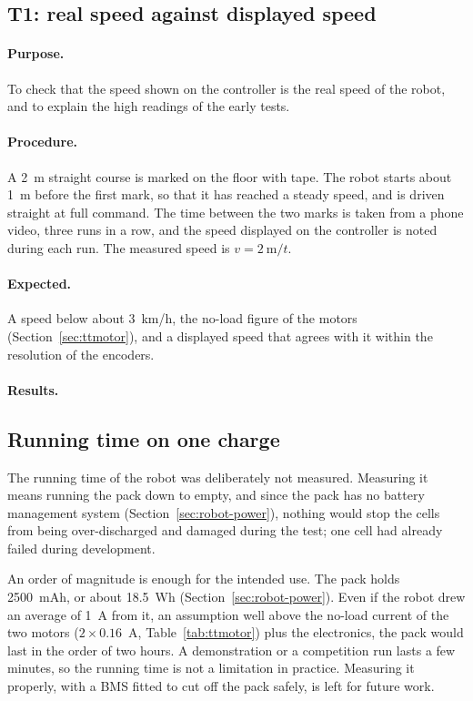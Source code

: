 \subsection{T1: real speed against displayed speed}
\paragraph{Purpose.} To check that the speed shown on the controller is the real speed of
the robot, and to explain the high readings of the early tests.
\paragraph{Procedure.} A 2~m straight course is marked on the floor with tape. The robot
starts about 1~m before the first mark, so that it has reached a steady speed, and is
driven straight at full command. The time between the two marks is taken from a phone
video, three runs in a row, and the speed displayed on the controller is noted during
each run. The measured speed is \(v = 2~\text{m} / t\).
\paragraph{Expected.} A speed below about 3~km/h, the no-load figure of the motors
(Section~\ref{sec:ttmotor}), and a displayed speed that agrees with it within the resolution of the
encoders.
\paragraph{Results.} 

\subsection{Running time on one charge}
The running time of the robot was deliberately not measured. Measuring it means running
the pack down to empty, and since the pack has no battery management system
(Section~\ref{sec:robot-power}), nothing would stop the cells from being over-discharged
and damaged during the test; one cell had already failed during development.

An order of magnitude is enough for the intended use. The pack holds 2500~mAh, or about
18.5~Wh (Section~\ref{sec:robot-power}). Even if the robot drew an average of 1~A from it,
an assumption well above the no-load current of the two motors (\(2 \times 0.16\)~A,
Table~\ref{tab:ttmotor}) plus the electronics, the pack would last in the order of two
hours. A demonstration or a competition run lasts a few minutes, so the running time is
not a limitation in practice. Measuring it properly, with a BMS fitted to cut off the
pack safely, is left for future work.

